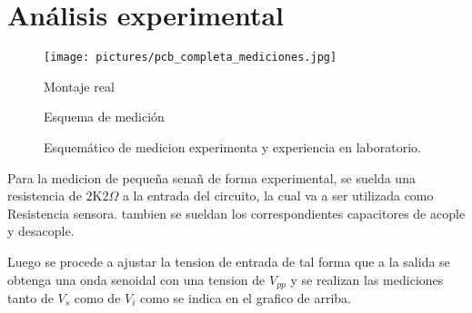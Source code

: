   \section{Análisis experimental}
    \begin{figure}[H]
      \centering
      \begin{minipage}[t]{0.35\textwidth}
        \centering
        \texttt{[image: pictures/pcb\_completa\_mediciones.jpg]}
        \caption*{Montaje real}
      \end{minipage}\hfill
      \begin{minipage}[t]{0.59\textwidth}
        \centering
        \caption*{Esquema de medición}
      \end{minipage}
      \caption{Esquemático de medicion experimenta y experiencia en laboratorio.}
      \label{fig:foto-tikz-inline}
    \end{figure}

    Para la medicion de pequeña senañ de forma experimental, se suelda una resistencia de $2\text{K}2\Omega$ a la entrada
    del circuito, la cual va a ser utilizada como Resistencia sensora. tambien se sueldan los correspondientes capacitores
    de acople y desacople.

    Luego se procede a ajustar la tension de entrada de tal forma que a la salida se obtenga una onda senoidal con una
    tension de $V_{pp}$ y se realizan las mediciones tanto de $V_s$ como de $V_i$ como se indica en el grafico de
    arriba.

